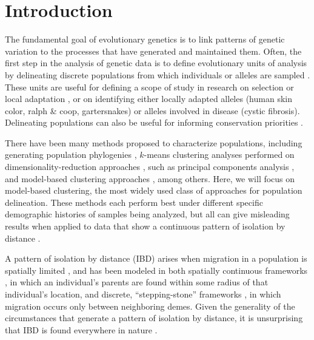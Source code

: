 \documentclass[12pt]{article}
\begin{document}


\newpage
\section*{Introduction}
The fundamental goal of evolutionary genetics is to link patterns of genetic variation 
to the processes that have generated and maintained them.
Often, the first step in the analysis of genetic data is to define evolutionary units of analysis
by delineating discrete populations from which individuals or alleles are sampled \citep{wright1949genetical}.
These units are useful for defining a scope of study in research on selection or local adaptation \citep{},
or on identifying either locally adapted alleles (human skin color, ralph \& coop, gartersnakes) or alleles involved in disease (cystic fibrosis).
Delineating populations can also be useful for informing conservation priorities \citep{}.

There have been many methods proposed to characterize populations,
including generating population phylogenies \citep{CavalliSforza1975, treemix},
$k$-means clustering analyses performed on dimensionality-reduction approaches \citep{}, 
such as principal components analysis \citep{menozzi1978synthetic,novembre_interpreting_2008, price2006eigenstrat},
and model-based clustering approaches \citep[e.g.][]{STRUCTURE, falush2003, hubisz2009,ADMIXTURE, FINESTRUCTURE, huelsenbeck2007inference, Corander2003,TESS}, among others.
Here, we will focus on model-based clustering, the most widely used class of approaches for population delineation.
These methods each perform best under different specific demographic histories of samples being analyzed,
but all can give misleading results when applied to data that show a continuous pattern of isolation by distance \citep{Wright 1938, 1940, Wright1943}.

A pattern of isolation by distance (IBD) arises when migration in a population is spatially limited \citep{Slatkin1985},
and has been modeled in both spatially continuous frameworks \citep{Wright1943,Malecot1948}, 
in which an individual's parents are found within some radius of that individual's location,
and discrete, ``stepping-stone'' frameworks \citep{Kimura1953},
in which migration occurs only between neighboring demes.
Given the generality of the circumstances that generate a pattern of isolation by distance, 
it is unsurprising that IBD is found everywhere in nature \citep{meirmans2012,Sexton_etal_2014}.
\end{document}
